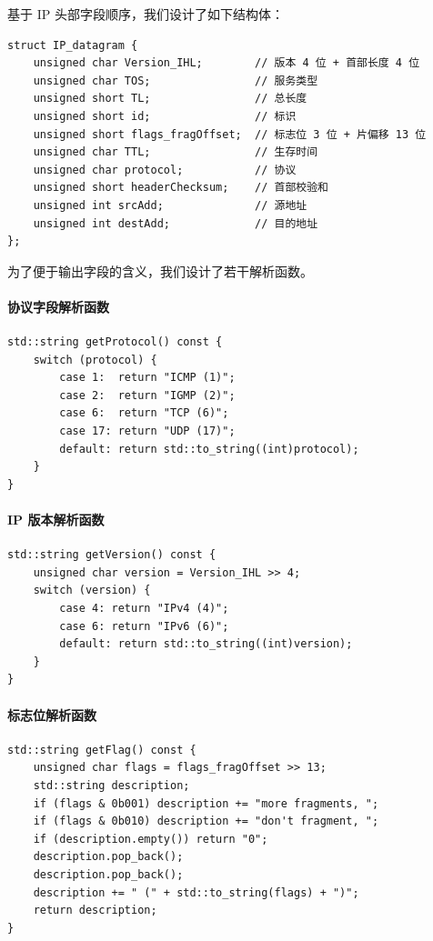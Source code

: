\documentclass[UTF8,12pt,a4paper]{ctexart}
\begin{document}
基于 IP 头部字段顺序，我们设计了如下结构体：

\begin{lstlisting}
struct IP_datagram {
    unsigned char Version_IHL;        // 版本 4 位 + 首部长度 4 位
    unsigned char TOS;                // 服务类型
    unsigned short TL;                // 总长度
    unsigned short id;                // 标识
    unsigned short flags_fragOffset;  // 标志位 3 位 + 片偏移 13 位
    unsigned char TTL;                // 生存时间
    unsigned char protocol;           // 协议
    unsigned short headerChecksum;    // 首部校验和
    unsigned int srcAdd;              // 源地址
    unsigned int destAdd;             // 目的地址
};
\end{lstlisting}

为了便于输出字段的含义，我们设计了若干解析函数。

\paragraph{协议字段解析函数}

\begin{lstlisting}
std::string getProtocol() const {
    switch (protocol) {
        case 1:  return "ICMP (1)";
        case 2:  return "IGMP (2)";
        case 6:  return "TCP (6)";
        case 17: return "UDP (17)";
        default: return std::to_string((int)protocol);
    }
}
\end{lstlisting}

\paragraph{IP 版本解析函数}

\begin{lstlisting}
std::string getVersion() const {
    unsigned char version = Version_IHL >> 4;
    switch (version) {
        case 4: return "IPv4 (4)";
        case 6: return "IPv6 (6)";
        default: return std::to_string((int)version);
    }
}
\end{lstlisting}

\paragraph{标志位解析函数}

\begin{lstlisting}
std::string getFlag() const {
    unsigned char flags = flags_fragOffset >> 13;
    std::string description;
    if (flags & 0b001) description += "more fragments, ";
    if (flags & 0b010) description += "don't fragment, ";
    if (description.empty()) return "0";
    description.pop_back();
    description.pop_back();
    description += " (" + std::to_string(flags) + ")";
    return description;
}
\end{lstlisting}
\end{document}
